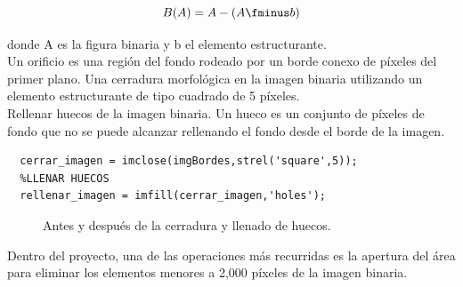 \documentclass[a4paper, 11pt]{article}
\begin{document}
\[B(A) = A - (A \fminus b)\]

donde A es la figura binaria y b el elemento estructurante.\\

Un orificio es una región del fondo rodeado por un borde conexo de píxeles del primer plano. Una cerradura morfológica en la imagen binaria utilizando un elemento estructurante de tipo cuadrado de 5 píxeles.\\

Rellenar huecos de la imagen binaria. Un hueco es un conjunto de píxeles de fondo que no se puede alcanzar rellenando el fondo desde el borde de la imagen.

\begin{lstlisting}[style=Matlab-editor, caption=Cerradura seguido de llenado de huecos.]
  %CERRAR CON ELEMENTO ESTRUCTURANTE SQUARE 5
  cerrar_imagen = imclose(imgBordes,strel('square',5));
  %LLENAR HUECOS
  rellenar_imagen = imfill(cerrar_imagen,'holes');
\end{lstlisting}

\begin{figure}[ht]%
    \centering
    \qquad
    \caption{Antes y después de la cerradura y llenado de huecos.}%
    \label{paso1}%
\end{figure}

Dentro del proyecto, una de las operaciones más recurridas es la apertura del área para eliminar los elementos menores a 2,000 píxeles de la imagen binaria.
\end{document}
